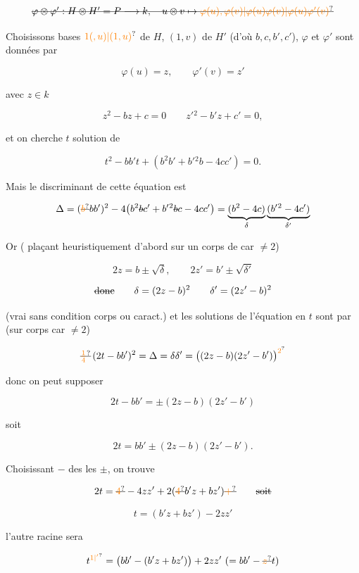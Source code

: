 
\[
\deleted{\varphi\otimes\varphi':H\otimes H'=P\longrightarrow k,\quad u\otimes v\mapsto\unsure{\varphi(u),\varphi(v)|\varphi(u)\varphi(v)|\varphi(u)\varphi'(v)}} 
\]


Choisissons bases $\unsure{1(,u)|(1,u)}$ de $H$, $(1,v)$ de $H'$
(d'où $b,c,b',c'$), $\varphi$ et $\varphi'$ sont données par

\[
\varphi(u)=z,\qquad\varphi'(v)=z'
\]

avec $z\in k$

\[
z^2-bz+c=0\qquad z'{}^2-b'z+c'=0,
\]

et on cherche $t$ solution de

\[
t^2-bb't+(b^2b'+b'{}^2b-4cc')=0.
\]

Mais le discriminant de cette équation est

\[
\Delta=(\deleted{\unsure{b}}bb')^2-4\bigl(b^2\deleted{b}c'+b'{}^2\deleted{b}c-4cc'\bigr)=
\underbrace{(b^2-4c)}_{\delta}\underbrace{(b'{}^2-4c')}_{\delta'}
\]

Or  ( plaçant  heuristiquement
d'abord sur un corps de car $\ne2$)

\[
2z=b\pm\sqrt{\delta},\qquad 2z'=b'\pm\sqrt{\delta'}
\]

\[
\text{\deleted{donc}}\qquad\delta=(2z-b)^2\qquad\delta'=(2z'-b)^2
\]

(vrai sans condition corps ou caract.)
et les solutions de l'équation en $t$ sont  par
(sur corps car $\ne2$) 

\[
\deleted{\unsure{\tfrac14}}\,(2t-bb')^2=\Delta=\delta\delta'=\bigl((2z-b)(2z'-b')\bigr)^{\unsure{2}}
\]

donc on peut  supposer

\[
2t-bb'=\pm(2z-b)(2z'-b')
\]

soit

\[
2t=bb'\pm(2z-b)(2z'-b').
\]

Choisissant $-$ des  les $\pm$, on trouve

\[
2t=\deleted{\unsure{4}}-4zz'+2(\deleted{\unsure{4}}b'z+bz')\deleted{\unsure{+}}\qquad\text{\deleted{soit}}
\]

\[
\boxed{t=(b'z+bz')-2zz'}
\]

l'autre racine sera

\[
t^{\unsure{1|'}}=\bigl(bb'-(b'z+bz')\bigr)+2zz'\ (=bb'-\deleted{\unsure{z}}t)
\]

